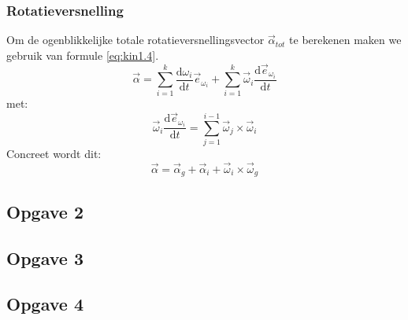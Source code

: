 \subsubsection{Rotatieversnelling}
Om de ogenblikkelijke totale rotatieversnellingsvector $\vec{\alpha}_{tot}$ te berekenen maken we gebruik van formule \eqref{eq:kin1.4}.
\begin{equation}
\vec{\alpha} = \sum_{i=1}^{k}{\frac{\mathrm{d}\omega_{i}}{\mathrm{d}t}\vec{e}_{\omega_{i}}}+\sum_{i=1}^{k}{\vec{\omega}_{i}\frac{\mathrm{d}\vec{e}_{\omega_{i}}}{\mathrm{d}t}}  
\label{eq:kin1.4}
\end{equation}
met:
\begin{equation}
\vec{\omega}_{i}\frac{\mathrm{d}\vec{e}_{\omega_{i}}}{\mathrm{d}t}=\sum_{j=1}^{i-1}{\vec{\omega}_{j}\times\vec{\omega}_{i}}  
\label{eq:kin1.5}
\end{equation}
Concreet wordt dit:
\begin{equation}
\vec{\alpha} = \vec{\alpha}_{g} + \vec{\alpha}_{i} + \vec{\omega}_{i} \times \vec{\omega}_{g}
\label{eq:kin1.5}
\end{equation}
\subsection{Opgave 2}
\subsection{Opgave 3}
\subsection{Opgave 4}